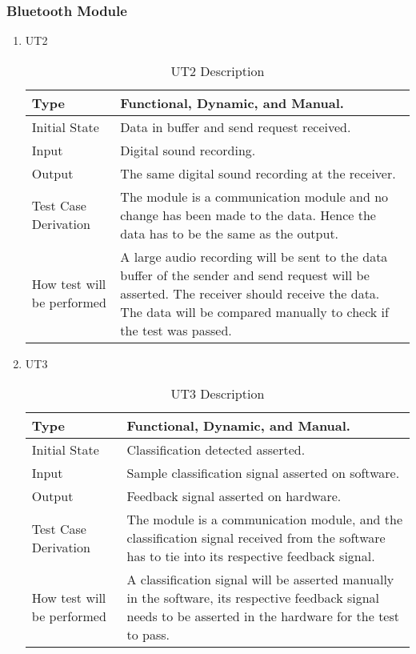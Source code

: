 \documentclass[12pt, titlepage]{article}
\begin{document}
\subsubsection{Bluetooth Module}

\begin{enumerate}

\item{UT2}

\begin{table}[H]
    \caption{UT2 Description}
\begin{tabular}{ |p{5cm}||p{7cm}| }
    \hline
    Type & Functional, Dynamic, and Manual. \\
    \hline
    Initial State  &  Data in buffer and send request received. \\
    \hline
    Input &   Digital sound recording.  \\
    \hline
    Output &   The same digital sound recording at the receiver.  \\
    \hline
    Test Case Derivation &   The module is a communication module and no change has been made to the data. Hence the data has to be the same as the output.\\
    \hline
    How test will be performed & A large audio recording will be sent to the data buffer of the sender and send request will be asserted. The receiver should receive the data. The data will be compared manually to check if the test was passed.\\
    \hline
\end{tabular}
\end{table}

\item{UT3}
\begin{table}[H]
    \caption{UT3 Description}
\begin{tabular}{ |p{5cm}||p{7cm}| }
    \hline
    Type & Functional, Dynamic, and Manual. \\
    \hline
    Initial State  &  Classification detected asserted. \\
    \hline
    Input &   Sample classification signal asserted on software.  \\
    \hline
    Output &   Feedback signal asserted on hardware.  \\
    \hline
    Test Case Derivation &   The module is a communication module, and the classification signal received from the software has to tie into its respective feedback signal.\\
    \hline
    How test will be performed & A classification signal will be asserted manually in the software, its respective feedback signal needs to be asserted in the hardware for the test to pass.\\
    \hline
\end{tabular}
\end{table}
\end{enumerate}
\end{document}
